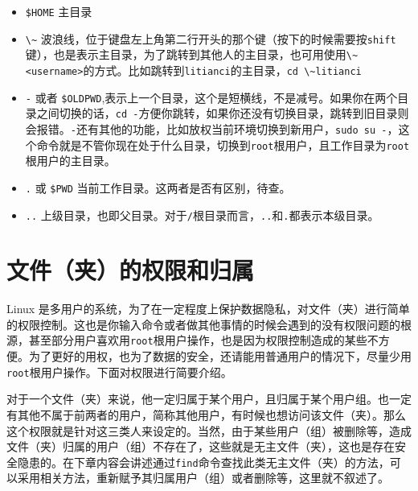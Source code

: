 \documentclass[doctor,openright,twoside]{sjtuthesis}
\providecommand{\tightlist}{%
    \setlength{\itemsep}{0pt}\setlength{\parskip}{0pt}}
\newcommand{\passthrough}[1]{#1}
\theoremstyle{plain}
\theoremstyle{definition}
\theoremstyle{remark}
\theoremstyle{ocrenumbox}
\theoremstyle{plain}
\begin{document}
\begin{itemize}
\tightlist
\item
  \passthrough{\lstinline!$HOME!} 主目录
\item
  \passthrough{\lstinline!\~!}
  波浪线，位于键盘左上角第二行开头的那个键（按下的时候需要按\passthrough{\lstinline!shift!}键），也是表示主目录，为了跳转到其他人的主目录，也可用使用\passthrough{\lstinline!\~<username>!}的方式。比如跳转到\passthrough{\lstinline!litianci!}的主目录，\passthrough{\lstinline!cd \~litianci!}
\item
  \passthrough{\lstinline!-!} 或者
  \passthrough{\lstinline!$OLDPWD!},表示上一个目录，这个是短横线，不是减号。如果你在两个目录之间切换的话，\passthrough{\lstinline!cd -!}方便你跳转，如果你还没有切换目录，跳转到旧目录则会报错。\passthrough{\lstinline!-!}还有其他的功能，比如放权当前环境切换到新用户，\passthrough{\lstinline!sudo su -!}，这个命令就是不管你现在处于什么目录，切换到\passthrough{\lstinline!root!}根用户，且工作目录为\passthrough{\lstinline!root!}根用户的主目录。
\item
  \passthrough{\lstinline!.!} 或 \passthrough{\lstinline!$PWD!}
  当前工作目录。这两者是否有区别，待查。
\item
  \passthrough{\lstinline!..!}
  上级目录，也即父目录。对于\passthrough{\lstinline!/!}根目录而言，\passthrough{\lstinline!..!}和\passthrough{\lstinline!.!}都表示本级目录。
\end{itemize}

\section{文件（夹）的权限和归属}

Linux
是多用户的系统，为了在一定程度上保护数据隐私，对文件（夹）进行简单的权限控制。这也是你输入命令或者做其他事情的时候会遇到的没有权限问题的根源，甚至部分用户喜欢用\passthrough{\lstinline!root!}根用户操作，也是因为权限控制造成的某些不方便。为了更好的用权，也为了数据的安全，还请能用普通用户的情况下，尽量少用\passthrough{\lstinline!root!}根用户操作。下面对权限进行简要介绍。

对于一个文件（夹）来说，他一定归属于某个用户，且归属于某个用户组。也一定有其他不属于前两者的用户，简称其他用户，有时候也想访问该文件（夹）。那么这个权限就是针对这三类人来设定的。当然，由于某些用户（组）被删除等，造成文件（夹）归属的用户（组）不存在了，这些就是无主文件（夹），这也是存在安全隐患的。在下章内容会讲述通过\passthrough{\lstinline!find!}命令查找此类无主文件（夹）的方法，可以采用相关方法，重新赋予其归属用户（组）或者删除等，这里就不叙述了。
\end{document}
